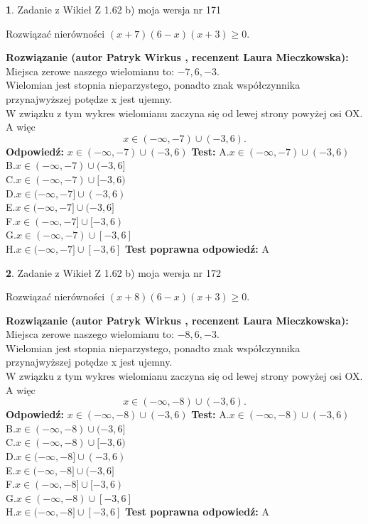 \documentclass[12pt, a4paper]{article}
\theoremstyle{definition} %
\newtheorem{zad}{}
\newcommand{\zadStart}[1]{\begin{zad}#1\newline}
\newcommand{\zadStop}{\end{zad}}
\newcommand{\rozwStart}[2]{\noindent \textbf{Rozwiązanie (autor #1 , recenzent #2): }\newline}
\newcommand{\rozwStop}{\newline}
\newcommand{\odpStart}{\noindent \textbf{Odpowiedź:}\newline}
\newcommand{\odpStop}{\newline}
\newcommand{\testStart}{\noindent \textbf{Test:}\newline}
\newcommand{\testStop}{\newline}
\newcommand{\kluczStart}{\noindent \textbf{Test poprawna odpowiedź:}\newline}
\newcommand{\kluczStop}{\newline}
\begin{document}
\zadStart{Zadanie z Wikieł Z 1.62 b) moja wersja nr 171}

Rozwiązać nierówności $(x+7)(6-x)(x+3)\ge0$.
\zadStop
\rozwStart{Patryk Wirkus}{Laura Mieczkowska}
Miejsca zerowe naszego wielomianu to: $-7, 6, -3$.\\
Wielomian jest stopnia nieparzystego, ponadto znak współczynnika przy\linebreak najwyższej potędze x jest ujemny.\\ W związku z tym wykres wielomianu zaczyna się od lewej strony powyżej osi OX. A więc $$x \in (-\infty,-7) \cup (-3,6).$$
\rozwStop
\odpStart
$x \in (-\infty,-7) \cup (-3,6)$
\odpStop
\testStart
A.$x \in (-\infty,-7) \cup (-3,6)$\\
B.$x \in (-\infty,-7) \cup (-3,6]$\\
C.$x \in (-\infty,-7) \cup [-3,6)$\\
D.$x \in (-\infty,-7] \cup (-3,6)$\\
E.$x \in (-\infty,-7] \cup (-3,6]$\\
F.$x \in (-\infty,-7] \cup [-3,6)$\\
G.$x \in (-\infty,-7) \cup [-3,6]$\\
H.$x \in (-\infty,-7] \cup [-3,6]$
\testStop
\kluczStart
A
\kluczStop



\zadStart{Zadanie z Wikieł Z 1.62 b) moja wersja nr 172}

Rozwiązać nierówności $(x+8)(6-x)(x+3)\ge0$.
\zadStop
\rozwStart{Patryk Wirkus}{Laura Mieczkowska}
Miejsca zerowe naszego wielomianu to: $-8, 6, -3$.\\
Wielomian jest stopnia nieparzystego, ponadto znak współczynnika przy\linebreak najwyższej potędze x jest ujemny.\\ W związku z tym wykres wielomianu zaczyna się od lewej strony powyżej osi OX. A więc $$x \in (-\infty,-8) \cup (-3,6).$$
\rozwStop
\odpStart
$x \in (-\infty,-8) \cup (-3,6)$
\odpStop
\testStart
A.$x \in (-\infty,-8) \cup (-3,6)$\\
B.$x \in (-\infty,-8) \cup (-3,6]$\\
C.$x \in (-\infty,-8) \cup [-3,6)$\\
D.$x \in (-\infty,-8] \cup (-3,6)$\\
E.$x \in (-\infty,-8] \cup (-3,6]$\\
F.$x \in (-\infty,-8] \cup [-3,6)$\\
G.$x \in (-\infty,-8) \cup [-3,6]$\\
H.$x \in (-\infty,-8] \cup [-3,6]$
\testStop
\kluczStart
A
\kluczStop
\end{document}

